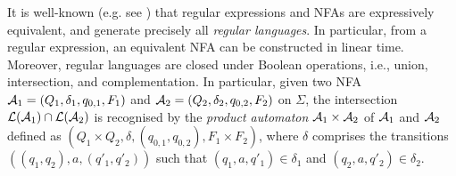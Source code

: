 {It is well-known (e.g. see \cite{HU79}) that regular expressions and NFAs are
expressively equivalent, and generate precisely all \emph{regular languages}.
In particular, from a regular expression, an equivalent NFA can be constructed
in linear time. Moreover, regular languages are closed under Boolean
operations, i.e., union, intersection, and complementation.
In particular, given two NFA $\mathcal{A}_1=(Q_1, \delta_1, q_{0,1}, F_1)$ and
$\mathcal{A}_2=(Q_2, \delta_2, q_{0,2}, F_2)$ on $\Sigma$, the intersection $\mathcal{L}(\mathcal{A}_1)
\cap \mathcal{L}(\mathcal{A}_2)$ is recognised by the \emph{product automaton} $\mathcal{A}_1 \times
\mathcal{A}_2$ of $\mathcal{A}_1$ and $\mathcal{A}_2$ defined as $(Q_1 \times Q_2, \delta, (q_{0,1}, q_{0,2}), F_1 \times F_2)$, where $\delta$ comprises the transitions $((q_1, q_2), a, (q'_1, q'_2))$ such that $(q_1, a, q'_1) \in \delta_1$ and $(q_2, a, q'_2) \in \delta_2$.
}
